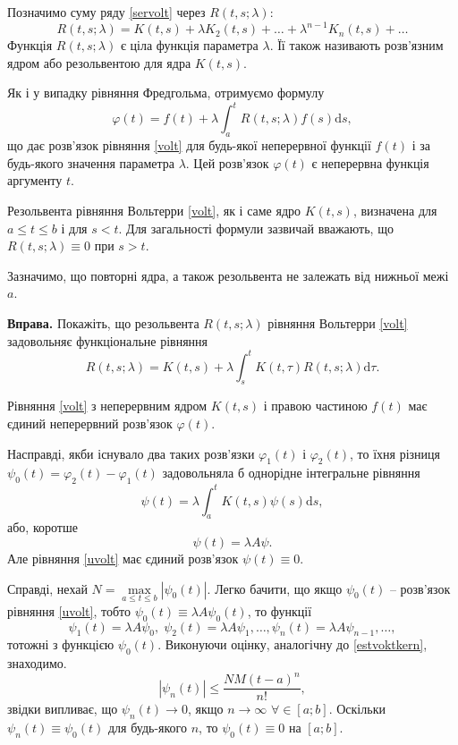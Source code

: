 \documentclass[14pt,twoside]{extreport}
\theoremstyle{mystyle}
\numberwithin{equation}{chapter}
\begin{document}
Позначимо суму ряду \eqref{servolt} через $R(t, s; \lambda)$:
\begin{equation}\label{resolventseries}
 R(t, s; \lambda) = K(t, s) + \lambda K_2(t, s) + \ldots + \lambda^{n-1} K_n(t, s) + \ldots
\end{equation}
Функція $R(t, s; \lambda)$ є ціла функція параметра $\lambda$. Її також називають розв'язним ядром або резольвентою для ядра $K(t, s)$.

Як і у випадку рівняння Фредгольма, отримуємо формулу
\begin{equation}\label{phiresolvent}
 \varphi(t) = f(t) + \lambda \int_{a}^{t} R(t, s; \lambda) f(s) \mathrm{d}s,
\end{equation}
що дає розв'язок рівняння \eqref{volt} для будь-якої неперервної функції $f(t)$ і за будь-якого значення параметра $\lambda$. Цей розв'язок $\varphi(t)$ є неперервна функція аргументу $t$.

Резольвента рівняння Вольтерри \eqref{volt}, як і саме ядро $K(t, s)$, визначена для $a \leqslant t \leqslant b$ і для $s < t$. Для загальності формули зазвичай вважають, що $R (t, s; \lambda) \equiv 0$ при $s > t$.

Зазначимо, що повторні ядра, а також резольвента не залежать від нижньої межі $a$.

\begin{small}
\textbf{Вправа.} Покажіть, що резольвента $R(t, s; \lambda)$ рівняння Вольтерри \eqref{volt} задовольняє функціональне рівняння
\[
R(t, s; \lambda) = K(t, s) + \lambda \int_{s}^{t} K(t, \tau) R(t, s; \lambda) \mathrm{d}\tau.
\]
\end{small}

Рівняння \eqref{volt} з неперервним ядром $K(t, s)$ і правою частиною $f(t)$ має єдиний неперервний розв'язок $\varphi(t)$.

Насправді, якби існувало два таких розв'язки $\varphi_1(t)$ і $\varphi_2(t)$, то їхня різниця $\psi_0(t) = \varphi_2(t) - \varphi_1(t)$ задовольняла б однорідне інтегральне рівняння
\begin{equation}\label{uvolt}
 \psi(t) = \lambda \int_{a}^{t} K(t, s) \psi(s) \mathrm{d}s,
\end{equation}
або, коротше
\[
 \psi(t) = \lambda A\psi.
\]
Але рівняння \eqref{uvolt} має єдиний розв'язок $\psi(t) \equiv 0$.

Справді, нехай $N = \max\limits_{a \leqslant t \leqslant b} |\psi_0 (t)|$. Легко бачити, що якщо $\psi_0(t)$ -- розв'язок рівняння \eqref{uvolt}, тобто $\psi_0(t) \equiv \lambda A \psi_0(t)$, то функції
\[
 \psi_1(t) = \lambda A\psi_0, \; \psi_2(t) = \lambda A \psi_1, \ldots , \psi_n(t) = \lambda A\psi_{n-1} , \ldots,
\]
тотожні з функцією $\psi_0(t)$. Виконуючи оцінку, аналогічну до \eqref{estvoktkern}, знаходимо.
\[
 |\psi_n(t)| \leqslant \dfrac{NM(t-a)^n}{n!},
\]
звідки випливає, що $\psi_n(t) \to 0$, якщо $n \to \infty$ $\forall \in [a; b]$. Оскільки $\psi_n(t) \equiv \psi_0(t)$ для будь-якого $n$, то $\psi_0(t) \equiv 0$ на $[a; b]$.
\end{document}
